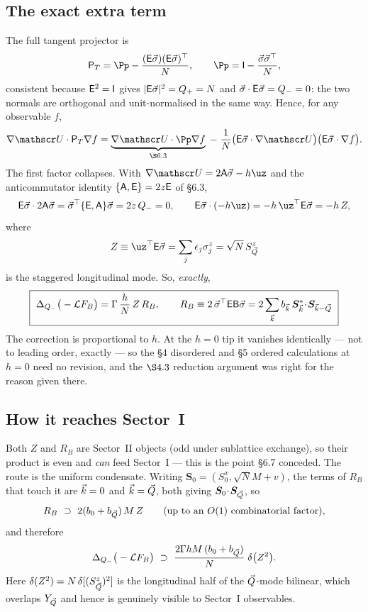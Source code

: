 \subsection{The exact extra term}
The full tangent projector is
\begin{equation}
  \Pt=\Pp-\frac{(\Em\bs)(\Em\bs)^{\top}}{N},
  \qquad \Pp=\mathsf I-\frac{\bs\bs^{\top}}{N},
\end{equation}
consistent because $\mathsf{E}^{2}=\mathsf I$ gives $|\mathsf{E}\vec\sigma|^{2}=Q_+=N$ and
$\vec\sigma\cdot\mathsf{E}\vec\sigma=Q_-=0$: the two normals are orthogonal and unit-normalised in the same way.
Hence, for any observable $f$,
\begin{equation}
  \nabla\Uc\cdot\Pt\nabla f
  =\underbrace{\nabla\Uc\cdot\Pp\nabla f}_{\text{\S6.3}}
   \;-\;\frac{1}{N}\big(\Em\bs\cdot\nabla\Uc\big)\big(\Em\bs\cdot\nabla f\big).
\end{equation}
The first factor collapses. With $\nabla\Uc=2\mathsf A\bs-h\uz$ and the anticommutator
identity $\{\mathsf A,\mathsf{E}\}=2z\mathsf{E}$ of \S6.3,
\begin{equation}
  \Em\bs\cdot 2\mathsf A\bs=\bs^{\top}\{\Em,\mathsf A\}\bs=2z\,Q_-=0,
  \qquad
  \Em\bs\cdot(-h\uz)=-h\,\uz^{\top}\Em\bs=-h\,Z ,
\end{equation}
where
\begin{equation}
  Z\equiv\uz^{\top}\Em\bs=\sum_j\epsilon_j\sigma^z_j=\sqrt N\,S^z_{\bQ}
\end{equation}
is the staggered longitudinal mode. So, \emph{exactly},
\begin{equation}
  \boxed{\ \Delta_{Q_-}\big(-\Lc F_B\big)=\Gamma\,\frac{h}{N}\,Z\,R_B ,
  \qquad R_B\equiv2\,\bs^{\top}\Em\mathsf B\bs
   =2\sum_{\bk}b_{\bk}\,\bm S^{*}_{\bk}\!\cdot\!\bm S_{\bk-\bQ}\ }
  \label{eq:extra}
\end{equation}
 The correction is proportional to $h$. At the $h=0$ tip it
vanishes identically --- not to leading order, exactly --- so the \S4 disordered and \S5
ordered calculations at $h=0$ need no revision, and the $\S4.3$ reduction argument was
right for the reason given there.

\subsection{How it reaches Sector~I}
Both $Z$ and $R_B$ are Sector~II objects (odd under sublattice exchange), so their product
is even and \emph{can} feed Sector~I --- this is the point \S6.7 conceded. The route is the
uniform condensate. Writing $\bm S_0=(S^x_0,\sqrt NM+v)$, the terms of $R_B$ that touch it
are $\vec k=0$ and $\vec k=\vec Q$, both giving $\bm S_0\!\cdot\!\bm S_{\vec Q}$, so
\begin{equation}
  R_B\ \supset\ 2(b_0+b_{\vec Q})\,M\,Z\qquad(\text{up to an }O(1)\text{ combinatorial factor}),
\end{equation}
and therefore
\begin{equation}
  \Delta_{Q_-}\big(-\mathcal{L} F_B\big)\ \supset\
  \frac{2\Gamma h M\,(b_0+b_{\vec Q})}{N}\;\delta\big(Z^{2}\big) .
  \label{eq:channel}
\end{equation}
Here $\delta(Z^2)=N\,\delta[(S^z_{\vec Q})^{2}]$ is the longitudinal half of the $\vec Q$-mode
bilinear, which overlaps $Y_{\vec Q}$ and hence is genuinely visible to Sector~I observables.


